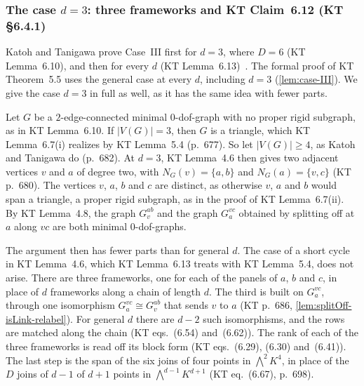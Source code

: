 \subsubsection{The case \texorpdfstring{$d = 3$}{d = 3}: three frameworks and KT Claim~6.12 (KT \S6.4.1)}
\label{sec:molecular-algebraic-induction-claim612}

Katoh and Tanigawa prove Case~III first for $d = 3$, where $D = 6$
(KT Lemma~6.10), and then for every $d$ (KT
Lemma~6.13)~\cite[\S6.4]{katohTanigawa2011}. The formal proof of KT
Theorem~5.5 uses the general case at every $d$, including $d = 3$
(\cref{lem:case-III}). We give the case $d = 3$ in full as well, as it
has the same idea with fewer parts.

Let $G$ be a $2$-edge-connected minimal $0$-dof-graph with no proper
rigid subgraph, as in KT Lemma~6.10. If $|V(G)| = 3$, then $G$ is a
triangle, which KT Lemma~6.7(i) realizes by KT Lemma~5.4 (p.~677). So
let $|V(G)| \ge 4$, as Katoh and Tanigawa do (p.~682). At $d = 3$, KT
Lemma~4.6 then gives two adjacent vertices $v$ and $a$ of degree two,
with $N_G(v) = \{a, b\}$ and $N_G(a) = \{v, c\}$ (KT p.~680). The
vertices $v$, $a$, $b$ and $c$ are distinct, as otherwise $v$, $a$ and
$b$ would span a triangle, a proper rigid subgraph, as in the proof of
KT Lemma~6.7(ii). By KT Lemma~4.8, the graph $G_v^{ab}$ and the graph
$G_a^{vc}$ obtained by splitting off at $a$ along $vc$ are both minimal
$0$-dof-graphs.

The argument then has fewer parts than for general $d$. The case of a
short cycle in KT Lemma~4.6, which KT Lemma~6.13 treats with KT
Lemma~5.4, does not arise. There are three frameworks, one for each of
the panels of $a$, $b$ and $c$, in place of $d$ frameworks along a
chain of length $d$. The third is built on $G_a^{vc}$, through one
isomorphism $G_a^{vc} \cong G_v^{ab}$ that sends $v$ to $a$ (KT
p.~686, \cref{lem:splitOff-isLink-relabel}). For general $d$ there are
$d - 2$ such isomorphisms, and the rows are matched along the chain
(KT eqs.~(6.54) and~(6.62)). The rank of each of the three frameworks
is read off its block form (KT eqs.~(6.29), (6.30) and~(6.41)). The
last step is the span of the six joins of four points in
$\bigwedge^2 K^4$, in place of the $D$ joins of $d - 1$ of $d + 1$
points in $\bigwedge^{d-1} K^{d+1}$ (KT eq.~(6.67), p.~698).

